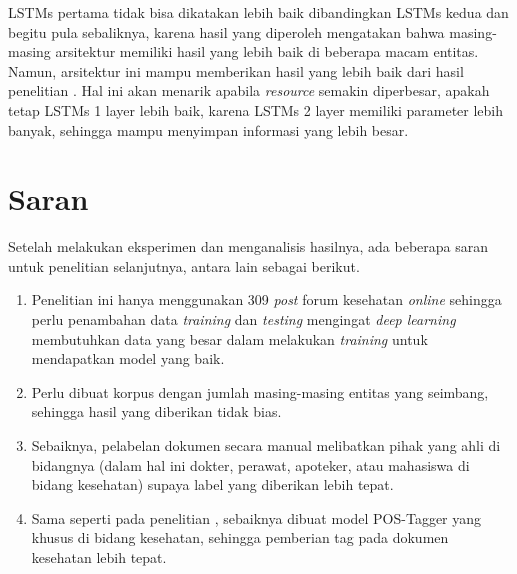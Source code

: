 LSTMs pertama tidak bisa dikatakan lebih baik dibandingkan LSTMs kedua dan begitu pula sebaliknya, karena hasil yang diperoleh mengatakan bahwa masing-masing arsitektur memiliki hasil yang lebih baik di beberapa macam entitas. Namun, arsitektur ini mampu memberikan hasil yang lebih baik dari hasil penelitian \cite{skripsiKakRadit}. Hal ini akan menarik apabila \textit{resource} semakin diperbesar, apakah tetap LSTMs 1 layer lebih baik, karena LSTMs 2 layer memiliki parameter lebih banyak, sehingga mampu menyimpan informasi yang lebih besar.

\section{Saran}
Setelah melakukan eksperimen dan menganalisis hasilnya, ada beberapa saran untuk penelitian selanjutnya, antara lain sebagai berikut.

\begin{enumerate}
  \item Penelitian ini hanya menggunakan 309 \textit{post} forum kesehatan \textit{online} sehingga perlu penambahan data \textit{training} dan \textit{testing} mengingat \textit{deep learning} membutuhkan data yang besar dalam melakukan \textit{training} untuk mendapatkan model yang baik.

  \item Perlu dibuat korpus dengan jumlah masing-masing entitas yang seimbang, sehingga hasil yang diberikan tidak bias.
  
  \item Sebaiknya, pelabelan dokumen secara manual melibatkan pihak yang ahli di bidangnya (dalam hal ini dokter, perawat, apoteker, atau mahasiswa di bidang kesehatan) supaya label yang diberikan lebih tepat.
  
  \item Sama seperti pada penelitian \cite{skripsiKakRadit}, sebaiknya dibuat model POS-Tagger yang khusus di bidang kesehatan, sehingga pemberian tag pada dokumen kesehatan lebih tepat.

\end{enumerate}